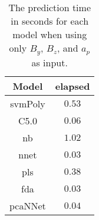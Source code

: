 \begin{table}[!ht]
	\centering
	\begin{tabular}{|c|c|}
		\hline
		Model & elapsed \\ \hline
		svmPoly & $0.53$ \\ \hline
		C5.0 & $0.06$ \\ \hline
		nb & $1.02$ \\ \hline
		nnet & $0.03$ \\ \hline
		pls & $0.38$ \\ \hline
		fda & $0.03$ \\ \hline
		pcaNNet & $0.04$ \\ \hline
	\end{tabular}
	\caption{The prediction time in seconds for each model when using only $B_{y}$, $B_{z}$, and $a_{p}$ as input.}
	\label{tab:time:yzap:predict}
\end{table}
